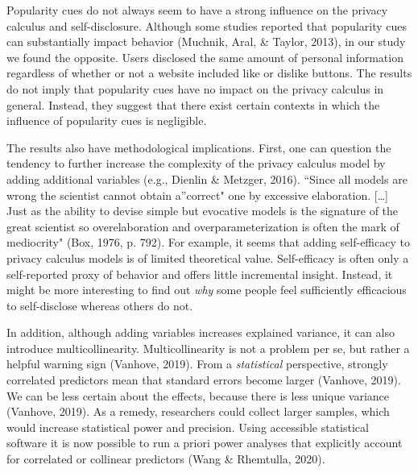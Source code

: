 \documentclass[
  english,
  man,floatsintext]{apa6}
\begin{document}
Popularity cues do not always seem to have a strong influence on the privacy calculus and self-disclosure.
Although some studies reported that popularity cues can substantially impact behavior (Muchnik, Aral, \& Taylor, 2013), in our study we found the opposite.
Users disclosed the same amount of personal information regardless of whether or not a website included like or dislike buttons.
The results do not imply that popularity cues have no impact on the privacy calculus in general.
Instead, they suggest that there exist certain contexts in which the influence of popularity cues is negligible.

The results also have methodological implications.
First, one can question the tendency to further increase the complexity of the privacy calculus model by adding additional variables (e.g., Dienlin \& Metzger, 2016).
``Since all models are wrong the scientist cannot obtain a''correct" one by excessive elaboration. {[}\ldots{]} Just as the ability to devise simple but evocative models is the signature of the great scientist so overelaboration and overparameterization is often the mark of mediocrity" (Box, 1976, p. 792).
For example, it seems that adding self-efficacy to privacy calculus models is of limited theoretical value.
Self-efficacy is often only a self-reported proxy of behavior and offers little incremental insight.
Instead, it might be more interesting to find out \emph{why} some people feel sufficiently efficacious to self-disclose whereas others do not.

In addition, although adding variables increases explained variance, it can also introduce multicollinearity.
Multicollinearity is not a problem per se, but rather a helpful warning sign (Vanhove, 2019).
From a \emph{statistical} perspective, strongly correlated predictors mean that standard errors become larger (Vanhove, 2019).
We can be less certain about the effects, because there is less unique variance (Vanhove, 2019).
As a remedy, researchers could collect larger samples, which would increase statistical power and precision.
Using accessible statistical software it is now possible to run a priori power analyses that explicitly account for correlated or collinear predictors (Wang \& Rhemtulla, 2020).
\end{document}
